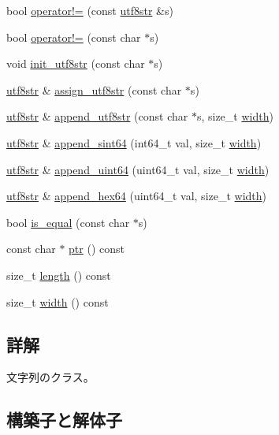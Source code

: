 \begin{DoxyCompactItemize}
\item 
bool \hyperlink{classutf8str_a0cf4339625674316856ae65e34ed06e0}{operator!=} (const \hyperlink{classutf8str}{utf8str} \&s)
\item 
bool \hyperlink{classutf8str_a90b215f868b10823c4baf3dd90a82748}{operator!=} (const char $\ast$s)
\item 
void \hyperlink{classutf8str_a5ef95f6ceb8fe7e0194d1f46b3a478a4}{init\+\_\+utf8str} (const char $\ast$s)
\item 
\hyperlink{classutf8str}{utf8str} \& \hyperlink{classutf8str_ada3fecdd9d8b8bffe810891e3510fe23}{assign\+\_\+utf8str} (const char $\ast$s)
\item 
\hyperlink{classutf8str}{utf8str} \& \hyperlink{classutf8str_a45bfe024b4a081b4b78588c250bf412b}{append\+\_\+utf8str} (const char $\ast$s, size\+\_\+t \hyperlink{classutf8str_ab62898084f6b49c7f318e91dbe3e5eb1}{width})
\item 
\hyperlink{classutf8str}{utf8str} \& \hyperlink{classutf8str_ae978ea3d847dafc5144d526ab280e41b}{append\+\_\+sint64} (int64\+\_\+t val, size\+\_\+t \hyperlink{classutf8str_ab62898084f6b49c7f318e91dbe3e5eb1}{width})
\item 
\hyperlink{classutf8str}{utf8str} \& \hyperlink{classutf8str_a50b19cd178e6ed1826eeb178b70f6ad0}{append\+\_\+uint64} (uint64\+\_\+t val, size\+\_\+t \hyperlink{classutf8str_ab62898084f6b49c7f318e91dbe3e5eb1}{width})
\item 
\hyperlink{classutf8str}{utf8str} \& \hyperlink{classutf8str_a33d69e7615a354019452458a3bfdc6ef}{append\+\_\+hex64} (uint64\+\_\+t val, size\+\_\+t \hyperlink{classutf8str_ab62898084f6b49c7f318e91dbe3e5eb1}{width})
\item 
bool \hyperlink{classutf8str_a34dc1b1052dcc2926c50dfb80d4ad812}{is\+\_\+equal} (const char $\ast$s)
\item 
const char $\ast$ \hyperlink{classutf8str_a93ef54e383307f426508eb4b88a3a7b9}{ptr} () const
\item 
size\+\_\+t \hyperlink{classutf8str_a3b489cf2af0d19ad973b307c3df750c9}{length} () const
\item 
size\+\_\+t \hyperlink{classutf8str_ab62898084f6b49c7f318e91dbe3e5eb1}{width} () const
\end{DoxyCompactItemize}


\subsection{詳解}
文字列のクラス。 

\subsection{構築子と解体子}
\hypertarget{classutf8str_ade0a006e67b96bbd32c609df76b26d2c}{}\label{classutf8str_ade0a006e67b96bbd32c609df76b26d2c} 
